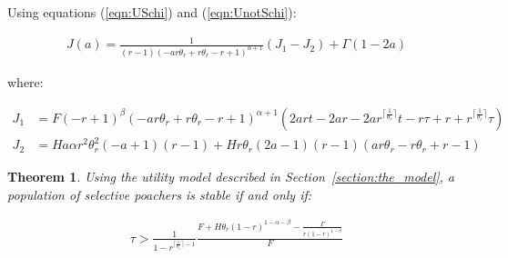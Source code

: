 \documentclass[10pt]{article}
\newtheorem{theorem}{Theorem}
\begin{document}
Using equations (\ref{eqn:USchi}) and (\ref{eqn:UnotSchi}):

\begin{equation}
    \begin{split}
    J(a) = \frac{1}{\left(r - 1\right) \left(- a r \theta_{r} + r \theta_{r} - r
+ 1\right)^{\alpha + 1}} \left(J_1 - J_2 \right) + \Gamma(1 - 2a)
    \end{split}
\end{equation}


where:

\begin{equation*}
    \begin{split}
    J_1 & = F \left(- r + 1\right)^{\beta} \left(- a r \theta_{r} + r \theta_{r}
    - r + 1\right)^{\alpha + 1} \left(2 a r t - 2 a r - 2 a
r^{\lceil{\frac{1}{\theta_{r}}}\rceil} t - r \tau + r +
r^{\lceil{\frac{1}{\theta_{r}}}\rceil} \tau\right)\\
    J_2 & = H a \alpha r^{2} \theta_{r}^{2} \left(- a + 1\right) \left(r - 1\right) + H r \theta_{r} \left(2 a - 1\right) \left(r - 1\right) \left(a r \theta_{r} - r \theta_{r} + r - 1\right)
    \end{split}
\end{equation*}


\begin{theorem}\label{theorem:selective}
Using the utility model described in Section~\ref{section:the_model},
a population of selective poachers is stable if and only if:

\begin{equation}
    \begin{split}\label{eq:selective_stability}
    \tau > \frac{1}{1 - r^{\lceil{\frac{1}{\theta_{r}}}\rceil - 1}}
    \frac{F + H \theta_{r} (1 - r) ^{1- \alpha -\beta}-\frac{\Gamma}{r(1-r)^{1-\beta}}}{F}
\end{split}
\end{equation}
\end{theorem}
\end{document}
